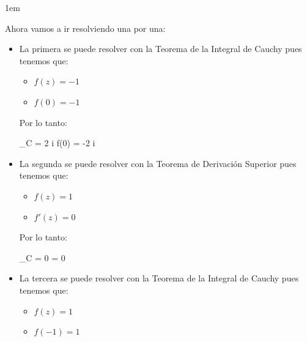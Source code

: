 \documentclass[12pt, fleqn]{report}                             %
\newenvironment{SmallIndentation}[1][0.75em]                    %
    {\begin{adjustwidth}{#1}{}\begin{footnotesize}}                 %
    {\end{footnotesize}\end{adjustwidth}}                           %
\newenvironment{MultiLineEquation*}[1]                          %
        {\begin{equation*}\begin{alignedat}{#1}}                    %
        {\end{alignedat}\end{equation*}}                            %
\begin{document}
\begin{SmallIndentation}[1em]
                    Ahora vamos a ir resolviendo una por una:
                    \begin{itemize}
                        \item
                            La primera se puede resolver con la Teorema de la Integral de Cauchy
                            pues tenemos que:
                            \begin{itemize}
                                \item $f(z) = -1$
                                \item $f(0) = -1$
                            \end{itemize}

                            Por lo tanto:
                            \begin{MultiLineEquation*}{3}
                                \oint_C  = 2 \pi i f(0) = -2 \pi i
                            \end{MultiLineEquation*}


                        \item
                            La segunda se puede resolver con la Teorema de Derivación Superior
                            pues tenemos que:
                            \begin{itemize}
                                \item $f(z) = 1$
                                \item $f'(z) = 0$
                            \end{itemize}

                            Por lo tanto:
                            \begin{MultiLineEquation*}{3}
                                \oint_C  =  0 = 0 
                            \end{MultiLineEquation*}


                        \item
                            La tercera se puede resolver con la Teorema de la Integral de Cauchy
                            pues tenemos que:
                            \begin{itemize}
                                \item $f(z) = 1$
                                \item $f(-1) = 1$
                            \end{itemize}


\end{itemize}
\end{SmallIndentation}
\end{document}
